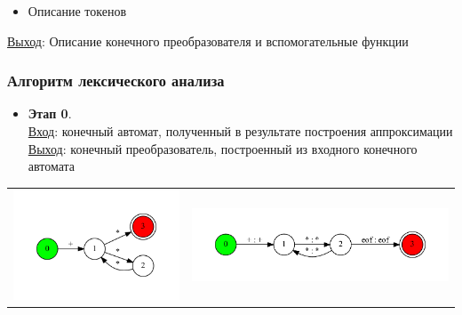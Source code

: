 \documentclass{beamer}
\begin{document}
\begin{frame}[fragile]
\begin{itemize}
\item Описание токенов
\end{itemize}

\underline{Выход}: Описание конечного преобразователя и вспомогательные функции
\end{frame}

\begin{frame}[fragile]
\transwipe[direction=90]
\frametitle{Алгоритм лексического анализа}
\begin{itemize}
\item \textbf{Этап 0}. \\
\underline{Вход}: конечный автомат, полученный в результате построения аппроксимации \\
\underline{Выход}: конечный преобразователь, построенный из входного конечного автомата
\end{itemize}

\begin{tabular}{l r}
     \begin{minipage}{.35\textwidth} 
     \includegraphics[width=\linewidth]{calc_ex}
     \end{minipage}  
     & 
    \begin{minipage}{.55\textwidth}    
     \includegraphics[width=\linewidth]{calc_ex_fst}
    \end{minipage} \\
\end{tabular} 
\end{frame}
\end{document}
